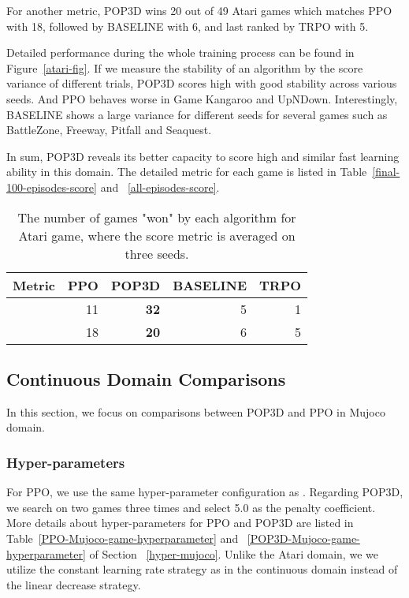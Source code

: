 \documentclass{article}
\begin{document}
For another metric, POP3D wins 20 out of 49 Atari games which matches PPO with 18, followed by BASELINE with 6, and last ranked by TRPO with 5. 

Detailed performance during the whole training process can be found in Figure~\ref{atari-fig}. If we measure the stability of an algorithm by the score variance of different trials, POP3D scores high with good stability across various seeds. And PPO behaves worse  in Game Kangaroo and UpNDown. Interestingly, BASELINE shows a large variance for different seeds for several games such as BattleZone, Freeway, Pitfall and Seaquest.

In sum, POP3D reveals its better capacity to score high and similar fast learning ability in this domain. 
The detailed metric for each game is listed in Table~\ref{final-100-episodes-score} and ~\ref{all-episodes-score}.
\begin{table}
	\begin{center}
		\begin{tabular}{lrrrr}
			\toprule
			Metric & PPO & POP3D & BASELINE & TRPO \\
			\midrule
			 & 11 &\textbf{32} & 5 & 1 \\
			  & 18 & \textbf{20} &6 &5\\
			\bottomrule
		\end{tabular}
	\end{center}
	\caption{The number of games "won" by each algorithm for Atari game, where the score metric is averaged on three seeds.}
	\label{atari_comparison_summary}
\end{table}

\subsection{Continuous Domain Comparisons}

In this section, we focus on comparisons between POP3D and PPO in Mujoco domain.

\subsubsection{Hyper-parameters}

For PPO, we use the same  hyper-parameter configuration as \cite{2017arXiv170706347S}. Regarding POP3D, we search on two games  three times and select 5.0 as the penalty coefficient. More details about hyper-parameters for PPO and POP3D  are listed in Table~\ref{PPO-Mujoco-game-hyperparameter} and ~\ref{POP3D-Mujoco-game-hyperparameter} of Section~ \ref{hyper-mujoco}. Unlike the Atari domain,  we we utilize the constant learning rate  strategy as \cite{2017arXiv170706347S} in the continuous domain instead of the linear decrease strategy.
\end{document}
